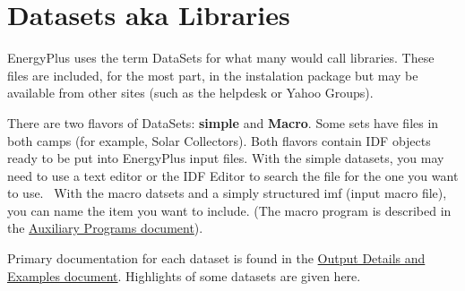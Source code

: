 \section{Datasets aka Libraries}\label{datasets-aka-libraries}

EnergyPlus uses the term DataSets for what many would call libraries. These files are included, for the most part, in the instalation package but may be available from other sites (such as the helpdesk or Yahoo Groups).

There are two flavors of DataSets: \textbf{simple} and \textbf{Macro}. Some sets have files in both camps (for example, Solar Collectors). Both flavors contain IDF objects ready to be put into EnergyPlus input files. With the simple datasets, you may need to use a text editor or the IDF Editor to search the file for the one you want to use.~ With the macro datsets and a simply structured imf (input macro file), you can name the item you want to include. (The macro program is described in the \href{file:///E:/Docs4PDFs/AuxiliaryPrograms.pdf}{Auxiliary Programs document}).

Primary documentation for each dataset is found in the \href{file:///E:/Docs4PDFs/OutputDetailsAndExamples.pdf}{Output Details and Examples document}. Highlights of some datasets are given here.
